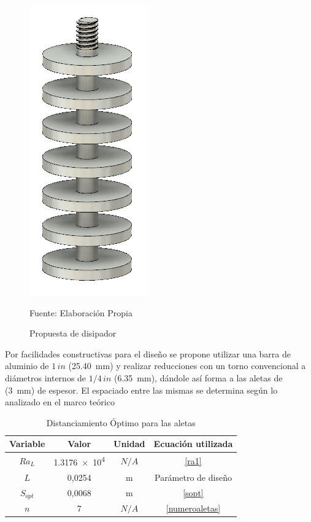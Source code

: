 \begin{figure}[H]
\centering
\includegraphics[scale=0.6]{Figuras/heat_sink.png}
\caption{Propuesta de disipador}
Fuente: Elaboración Propia
\label{heat_sink}
\end{figure}

Por facilidades constructivas para el diseño se propone utilizar una barra de aluminio de $1\,in$ (\SI{25,40}{\milli\meter}) y realizar reducciones con un torno convencional a diámetros internos de $1/4\,in$ (\SI{6,35}{\milli\meter}), dándole así forma a las aletas de (\SI{3}{\milli\meter}) de espesor. El espaciado entre las mismas se determina según lo analizado en el marco teórico

\begin{table}[H]
\centering
\caption{Distanciamiento Óptimo para las aletas}
\label{resultado_sopt}
\begin{tabular}{cccc}
\toprule
\textbf{Variable} & \textbf{Valor} & \textbf{Unidad} & \textbf{Ecuación utilizada} \\ \midrule
$Ra_{L}$ & \num{1,3176e4} & $N/A$ & \ref{ra1}           \\
$L$  & 0,0254               & \si{\meter}   & Parámetro de diseño \\
$S_{opt}$   & 0,0068  & \si{\meter} & \ref{sopt}    \\
$n$ & 7 & $N/A$ & \ref{numeroaletas}        \\ \bottomrule
\end{tabular}
\end{table}

